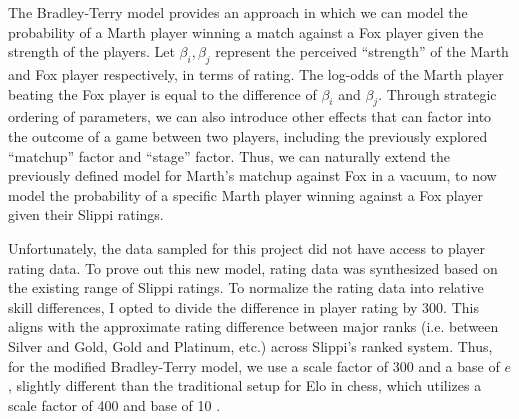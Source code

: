 The Bradley-Terry model provides an approach in which we can model the probability of a Marth player winning a match against a Fox player given the strength of the players. Let $\beta_i, \beta_j$ represent the perceived ``strength'' of the Marth and Fox player respectively, in terms of rating. The log-odds of the Marth player beating the Fox player is equal to the difference of $\beta_i$ and $\beta_j$\citep{Stanford_2016}. Through strategic ordering of parameters, we can also introduce other effects that can factor into the outcome of a game between two players, including the previously explored ``matchup'' factor and ``stage'' factor. Thus, we can naturally extend the previously defined model for Marth's matchup against Fox in a vacuum, to now model the probability of a specific Marth player winning against a Fox player given their Slippi ratings.

Unfortunately, the data sampled for this project did not have access to player rating data. To prove out this new model, rating data was synthesized based on the existing range of Slippi ratings. To normalize the rating data into relative skill differences, I opted to divide the difference in player rating by 300. This aligns with the approximate rating difference between major ranks (i.e. between Silver and Gold, Gold and Platinum, etc.) across Slippi's ranked system. Thus, for the modified Bradley-Terry model, we use a scale factor of 300 and a base of $e$, slightly different than the traditional setup for Elo in chess, which utilizes
a scale factor of 400 and base of 10 \citep{Beaume}.

